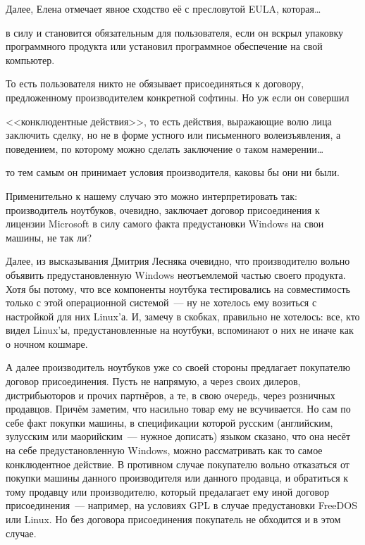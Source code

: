Далее, Елена отмечает явное сходство её с пресловутой EULA, которая\dots


\begin{shadequote}{}
 в силу и становится обязательным для пользователя, если он вскрыл упаковку программного продукта или установил программное обеспечение на свой компьютер.
\end{shadequote}

То есть пользователя никто не обязывает присоединяться к договору, предложенному производителем конкретной софтины. Но уж если он совершил


\begin{shadequote}{}
<<конклюдентные действия>>, то есть действия, выражающие волю лица заключить сделку, но не в форме устного или письменного волеизъявления, а поведением, по которому можно сделать заключение о таком намерении\dots
\end{shadequote}

то тем самым он принимает условия производителя, каковы бы они ни были.

Применительно к нашему случаю это можно интерпретировать так: производитель ноутбуков, очевидно, заключает договор присоединения к лицензии Microsoft в силу самого факта предустановки Windows на свои машины, не так ли?

Далее, из высказывания Дмитрия Лесняка очевидно, что производителю вольно объявить предустановленную Windows неотъемлемой частью своего продукта. Хотя бы потому, что все компоненты ноутбука тестировались на совместимость только с этой операционной системой~--- ну не хотелось ему возиться с настройкой для них Linux'а. И, замечу в скобках, правильно не хотелось: все, кто видел Linux'ы, предустановленные на ноутбуки, вспоминают о них не иначе как о ночном кошмаре.

А далее производитель ноутбуков уже со своей стороны предлагает покупателю договор присоединения. Пусть не напрямую, а через своих дилеров, дистрибьюторов и прочих партнёров, а те, в свою очередь, через розничных продавцов. Причём заметим, что насильно товар ему не всучивается. Но сам по себе факт покупки машины, в спецификации которой русским (английским, зулусским или маорийским~--- нужное дописать) языком сказано, что она несёт на себе предустановленную Windows, можно рассматривать как то самое конклюдентное действие. В противном случае покупателю вольно отказаться от покупки машины данного производителя или данного продавца, и обратиться к тому продавцу или производителю, который предалагает ему иной договор присоединения~--- например, на условиях GPL в случае предустановки FreeDOS или Linux. Но без договора присоединения покупатель не обходится и в этом случае.

